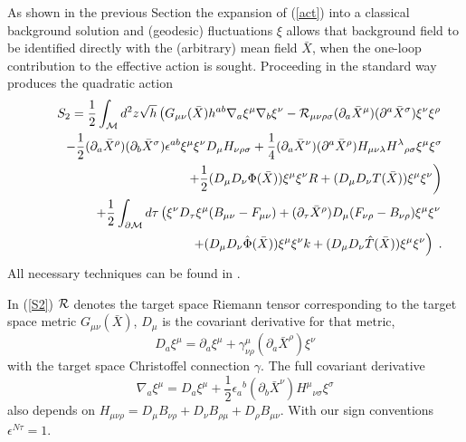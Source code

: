 \documentclass[a4paper,12pt]{article}
\begin{document}
As shown in the previous Section the expansion of 
(\ref{act}) into a classical background solution and 
(geodesic) fluctuations $\xi$ allows that background field  
to be identified directly with the (arbitrary) mean field 
$\bar X$, when the one-loop contribution to the effective 
action is sought. Proceeding in the standard way 
\cite{braaten85} produces
the quadratic action
\begin{eqnarray}
&&S_2=\frac 12 \int _{\cal M}d^{2}z\sqrt{h} \left(
G_{\mu\nu}(\bar X) h^{ab}
\nabla_{a}\xi^{\mu }\nabla_{b}\xi^{\nu }
-{\cal R}_{\mu\nu\rho\sigma}(\partial_a\bar X^\mu )
(\partial^a\bar X^\sigma )\xi^\nu\xi^\rho
\right.\nonumber \\
&& \qquad -\frac 12 (\partial_a\bar X^\rho )
(\partial_b\bar X^\sigma )\epsilon^{ab}\xi^\mu\xi^\nu
D_\mu H_{\nu\rho\sigma} 
 +\frac 14 (\partial_a\bar X^\nu )
(\partial^a\bar X^\rho ) H_{\mu\nu\lambda}{H^\lambda}_{\rho\sigma}
\xi^\mu\xi^\sigma \nonumber \\
&& \qquad \left. +\frac 12 (D_\mu D_\nu \Phi (\bar X) )\xi^\mu\xi^\nu R
+(D_\mu D_\nu T (\bar X) )\xi^\mu\xi^\nu \right) \label{S2} \\
&&\qquad +\frac 12 \int _{\partial {\cal M}}d\tau \left(
\xi^\nu D_\tau \xi^\mu (B_{\mu\nu}-F_{\mu\nu}) +
(\partial_\tau \bar X^\rho ) D_\mu (F_{\nu\rho}-B_{\nu\rho})\xi^\mu\xi^\nu
\right. \nonumber \\
&&\qquad \left. +(D_\mu D_\nu \hat \Phi (\bar X) )\xi^\mu\xi^\nu k
+ (D_\mu D_\nu \hat T (\bar X) )\xi^\mu\xi^\nu \right)\; .
\nonumber 
\end{eqnarray}
All necessary techniques can be found in \cite{braaten85,Osborn91}.

In (\ref{S2}) ${\cal R}$ denotes the target space Riemann tensor 
corresponding 
to the target space metric $G_{\mu\nu} (\bar X)$, $D_\mu$ is the covariant
derivative for that metric, 
\begin{equation}
D_a\xi^\mu =\partial_a\xi^\mu +\gamma_{\nu\rho}^\mu 
(\partial_a \bar X^\rho )\xi^\nu \label{covder}
\end{equation}
with the target space Christoffel connection $\gamma$. The full covariant
derivative
\begin{equation}
\nabla_a\xi^\mu =D_a \xi^\mu +\frac 12 {\epsilon_a}^b
(\partial_b \bar X^\nu ){H^\mu}_{\nu\sigma} \xi^\sigma
\label{nabla}
\end{equation}
also depends on
$H_{\mu\nu\rho}=D_\mu B_{\nu\rho}+D_\nu B_{\rho\mu}+
D_\rho B_{\mu\nu}$. 
With our sign conventions $\epsilon^{N\tau}=1$. 
\end{document}
